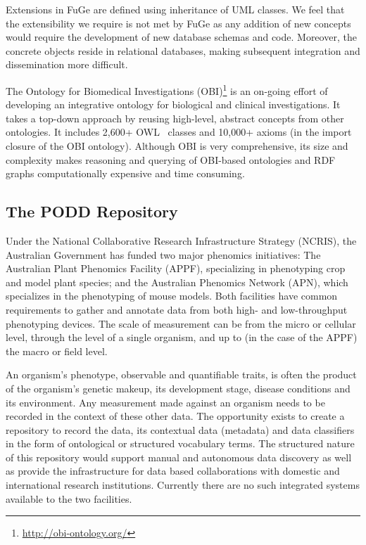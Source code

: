 \documentclass{llncs}
\begin{document}
Extensions in FuGe are defined using inheritance of UML classes. We
feel that the extensibility we require is not met by FuGe as any
addition of new concepts would require the development of new
database schemas and code. Moreover, the concrete objects reside in
relational databases, making subsequent integration and
dissemination more difficult.

The Ontology for Biomedical Investigations
(OBI)\footnote{\url{http://obi-ontology.org/}} is an on-going effort
of developing an integrative ontology for biological and clinical
investigations. It takes a top-down approach by reusing high-level,
abstract concepts from other ontologies. It includes 2,600+
OWL~\cite{hoph03a} classes and 10,000+ axioms (in the import closure
of the OBI ontology). Although OBI is very comprehensive, its size
and complexity makes reasoning and querying of OBI-based ontologies
and RDF graphs computationally expensive and time consuming.

\subsection{The PODD Repository}
Under the National Collaborative Research Infrastructure Strategy
(NCRIS), the Australian Government has funded two major phenomics
initiatives: The Australian Plant Phenomics Facility (APPF),
specializing in phenotyping crop and model plant species; and the
Australian Phenomics Network (APN), which specializes in the
phenotyping of mouse models. Both facilities have common
requirements to gather and annotate data from both high- and
low-throughput phenotyping devices. The scale of measurement can be
from the micro or cellular level, through the level of a single
organism, and up to (in the case of the APPF) the macro or field
level.

An organism's phenotype, observable and quantifiable traits, is
often the product of the organism's genetic makeup, its development
stage, disease conditions and its environment. Any measurement made
against an organism needs to be recorded in the context of these
other data. The opportunity exists to create a repository to record
the data, its contextual data (metadata) and data classifiers in the
form of ontological or structured vocabulary terms. The structured
nature of this repository would support manual and autonomous data
discovery as well as provide the infrastructure for data based
collaborations with domestic and international research
institutions. Currently there are no such integrated systems
available to the two facilities.
\end{document}
